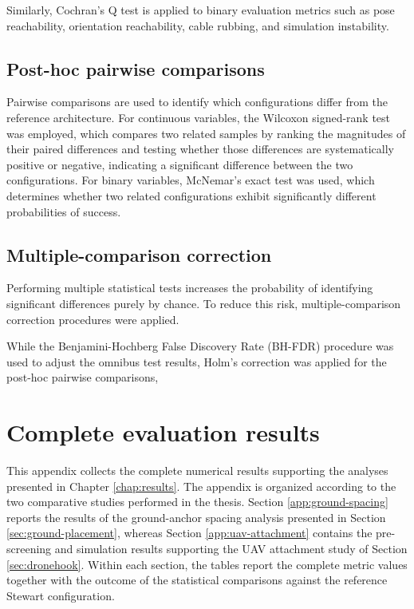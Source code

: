 Similarly, Cochran's Q test is applied to binary evaluation metrics such as pose reachability, orientation reachability, cable rubbing, and simulation instability.

\section{Post-hoc pairwise comparisons}

Pairwise comparisons are used to identify which configurations differ from the reference architecture. For continuous variables, the Wilcoxon signed-rank test was employed, which compares two related samples by ranking the magnitudes of their paired differences and testing whether those differences are systematically positive or negative, indicating a significant difference between the two configurations. For binary variables, McNemar's exact test was used, which determines whether two related configurations exhibit significantly different probabilities of success.

\section{Multiple-comparison correction}

Performing multiple statistical tests increases the probability of identifying significant differences purely by chance. To reduce this risk, multiple-comparison correction procedures were applied.

While the Benjamini-Hochberg False Discovery Rate (BH-FDR) procedure was used to adjust the omnibus test results, Holm's correction was applied for the post-hoc pairwise comparisons,


\chapter{Complete evaluation results}
\label{app:full_results}

This appendix collects the complete numerical results supporting the analyses presented in Chapter \ref{chap:results}. The appendix is organized according to the two comparative studies performed in the thesis. Section \ref{app:ground-spacing} reports the results of the ground-anchor spacing analysis presented in Section \ref{sec:ground-placement}, whereas Section \ref{app:uav-attachment} contains the pre-screening and simulation results supporting the UAV attachment study of Section \ref{sec:dronehook}. Within each section, the tables report the complete metric values together with the outcome of the statistical comparisons against the reference Stewart configuration.

